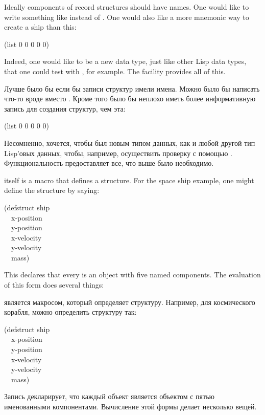 Ideally components of record structures should have names.  One would
like to write something like
 instead of .
One would also like a more mnemonic way to create a ship than this:
\begin{lisp}
(list 0 0 0 0 0)
\end{lisp}
Indeed, one would like  to be a new data type, just like other
Lisp data types, that one could test with , for example.
The  facility provides all of this.

Лучше было бы если бы записи структур имели имена. Можно было бы написать что-то
вроде  вместо . Кроме того было
бы неплохо иметь более информативную запись для создания структур, чем эта:
\begin{lisp}
(list 0 0 0 0 0)
\end{lisp}
Несомненно, хочется, чтобы  был новым типом данных, как и любой другой
тип Lisp'овых данных, чтобы, например, осуществить проверку с помощью
.
Функциональность  предоставляет все, что выше было необходимо.

 itself is a macro that defines a structure.  For the
space ship example, one might define the structure by saying:
\begin{lisp}
(defstruct ship \\
~~x-position \\
~~y-position \\
~~x-velocity \\
~~y-velocity \\
~~mass)
\end{lisp}
This declares that every  is an object with five named components.
The evaluation of this form does several things:

 является макросом, который определяет структуру. Например, для
космического корабля, можно определить структуру так:
\begin{lisp}
(defstruct ship \\
~~x-position \\
~~y-position \\
~~x-velocity \\
~~y-velocity \\
~~mass)
\end{lisp}
Запись декларирует, что каждый объект  является объектом с пятью
именованными компонентами. Вычисление этой формы делает несколько вещей.

